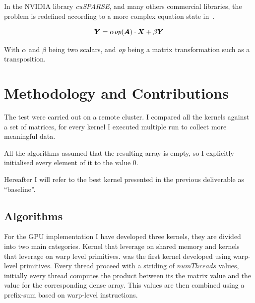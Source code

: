 \documentclass[conference]{IEEEtran}
\begin{document}
In the NVIDIA library \emph{cuSPARSE}, and many others commercial libraries, the problem is redefined according to a more complex equation state in~.

\begin{equation}\label{eq:2}
\bm{Y} = \alpha\emph{op}(\bm{A})\cdot\bm{X}+\beta\bm{Y}
\end{equation}

With \(\alpha\) and \(\beta\) being two scalars, and \emph{op} being a matrix transformation such as a transposition.
\section{Methodology and Contributions}\label{sec:methodology}

The test were carried out on a remote cluster. I compared all the kernels against a set of matrices, for every kernel I executed multiple run to collect more meaningful data.

All the algorithms assumed that the resulting array is empty, so I explicitly initialised every element of it to the value 0.

Hereafter I will refer to the best kernel presented in the previous deliverable as ``baseline''.

\subsection{Algorithms}\label{sec:algorithms}

For the GPU implementation I have developed three kernels, they are divided into two main categories. Kernel that leverage on shared memory and kernels that leverage on warp level primitives.  was the first kernel developed using warp-level primitives. Every thread proceed with a striding of \(\mathit{numThreads}\) values, initially every thread computes the product between its the matrix value and the value for the corresponding dense array. This values are then combined using a prefix-sum based on warp-level instructions.
\end{document}
